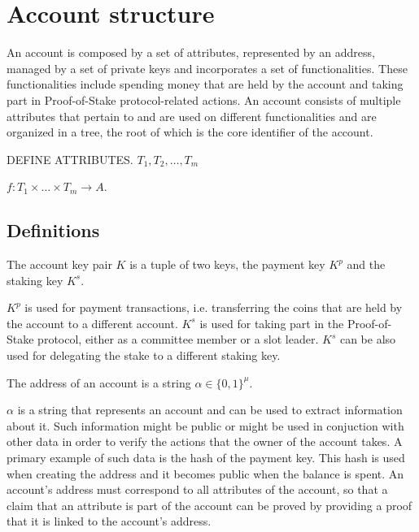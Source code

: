 \section{Account structure}\label{sec:account}

An account is composed by a set of attributes, represented by an address, managed by a set of private keys and incorporates a set of functionalities. These functionalities include spending money that are held by the account and taking part in Proof-of-Stake protocol-related actions. An account consists of multiple attributes that pertain to and are used on different functionalities and are organized in a tree, the root of which is the core identifier of the account.
 
DEFINE ATTRIBUTES.  $T_1, T_2, \ldots, T_m$

$f: T_1 \times \ldots \times T_m \rightarrow A$.

\subsection{Definitions}

\begin{defn}\label{def:keyset}
The account key pair $K$ is a tuple of two keys, the payment key $K^p$ and the staking key $K^s$.
\end{defn}

$K^p$ is used for payment transactions, i.e. transferring the coins that are held by the account to a different account. $K^s$ is used for taking part in the Proof-of-Stake protocol, either as a committee member or a slot leader. $K^s$ can be also used for delegating the stake to a different staking key.

\begin{defn}\label{def:address}
The address of an account is a string $\alpha \in \{0, 1\}^\mu$.
\end{defn}

$\alpha$ is a string that represents an account and can be used to extract information about it. Such information might be public or might be used in conjuction with other data in order to verify the actions that the owner of the account takes. A primary example of such data is the hash of the payment key. This hash is used when creating the address and it becomes public when the balance is spent. An account's address must correspond to all attributes of the account, so that a claim that an attribute is part of the account can be proved by providing a proof that it is linked to the account's address.

